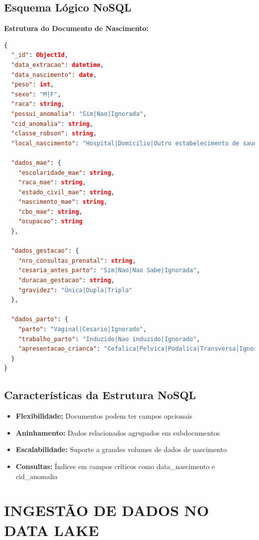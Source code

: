 \documentclass[12pt,a4paper]{article}
\begin{document}
\subsection{Esquema Lógico NoSQL}

\textbf{Estrutura do Documento de Nascimento:}

\begin{lstlisting}[style=sqlstyle, language=json, caption=Estrutura do Documento MongoDB]
{
  "_id": ObjectId,
  "data_extracao": datetime,
  "data_nascimento": date,
  "peso": int,
  "sexo": "M|F",
  "raca": string,
  "possui_anomalia": "Sim|Nao|Ignorada",
  "cid_anomalia": string,
  "classe_robson": string,
  "local_nascimento": "Hospital|Domicilio|Outro estabelecimento de saude|Outros",
  
  "dados_mae": {
    "escolaridade_mae": string,
    "raca_mae": string,
    "estado_civil_mae": string,
    "nascimento_mae": string,
    "cbo_mae": string,
    "ocupacao": string
  },
  
  "dados_gestacao": {
    "nro_consultas_prenatal": string,
    "cesaria_antes_parto": "Sim|Nao|Nao Sabe|Ignorada",
    "duracao_gestacao": string,
    "gravidez": "Única|Dupla|Tripla"
  },
  
  "dados_parto": {
    "parto": "Vaginal|Cesario|Ignorado",
    "trabalho_parto": "Induzido|Nao induzido|Ignorado",
    "apresentacao_crianca": "Cefalica|Pelvica|Podalica|Transversa|Ignorada"
  }
}
\end{lstlisting}

\subsection{Características da Estrutura NoSQL}

\begin{itemize}
    \item \textbf{Flexibilidade:} Documentos podem ter campos opcionais
    \item \textbf{Aninhamento:} Dados relacionados agrupados em subdocumentos
    \item \textbf{Escalabilidade:} Suporte a grandes volumes de dados de nascimento
    \item \textbf{Consultas:} Índices em campos críticos como data\_nascimento e cid\_anomalia
\end{itemize}

\section{INGESTÃO DE DADOS NO DATA LAKE}
\end{document}
